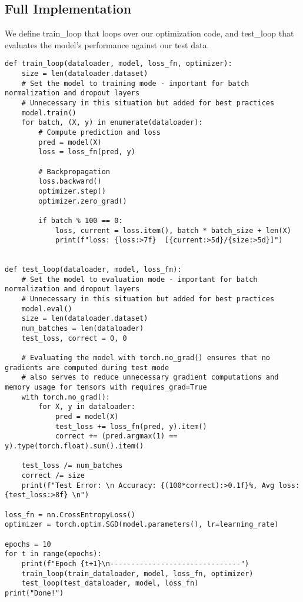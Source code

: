 \documentclass{article}
\begin{document}
\subsection{Full Implementation}

We define train\_loop that loops over our optimization code, and test\_loop that 
evaluates the model’s performance against our test data.

\begin{lstlisting}
def train_loop(dataloader, model, loss_fn, optimizer):
    size = len(dataloader.dataset)
    # Set the model to training mode - important for batch normalization and dropout layers
    # Unnecessary in this situation but added for best practices
    model.train()
    for batch, (X, y) in enumerate(dataloader):
        # Compute prediction and loss
        pred = model(X)
        loss = loss_fn(pred, y)

        # Backpropagation
        loss.backward()
        optimizer.step()
        optimizer.zero_grad()

        if batch % 100 == 0:
            loss, current = loss.item(), batch * batch_size + len(X)
            print(f"loss: {loss:>7f}  [{current:>5d}/{size:>5d}]")


def test_loop(dataloader, model, loss_fn):
    # Set the model to evaluation mode - important for batch normalization and dropout layers
    # Unnecessary in this situation but added for best practices
    model.eval()
    size = len(dataloader.dataset)
    num_batches = len(dataloader)
    test_loss, correct = 0, 0

    # Evaluating the model with torch.no_grad() ensures that no gradients are computed during test mode
    # also serves to reduce unnecessary gradient computations and memory usage for tensors with requires_grad=True
    with torch.no_grad():
        for X, y in dataloader:
            pred = model(X)
            test_loss += loss_fn(pred, y).item()
            correct += (pred.argmax(1) == y).type(torch.float).sum().item()

    test_loss /= num_batches
    correct /= size
    print(f"Test Error: \n Accuracy: {(100*correct):>0.1f}%, Avg loss: {test_loss:>8f} \n")

loss_fn = nn.CrossEntropyLoss()
optimizer = torch.optim.SGD(model.parameters(), lr=learning_rate)

epochs = 10
for t in range(epochs):
    print(f"Epoch {t+1}\n-------------------------------")
    train_loop(train_dataloader, model, loss_fn, optimizer)
    test_loop(test_dataloader, model, loss_fn)
print("Done!")
\end{lstlisting}
\end{document}
